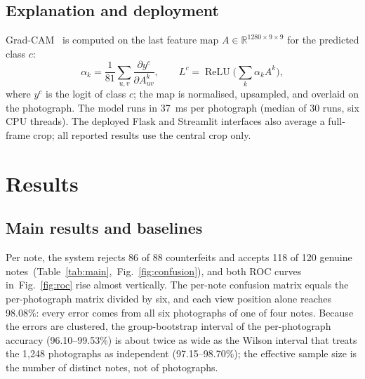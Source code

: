 \documentclass[pdflatex,iicol,sn-mathphys-num]{sn-jnl}
\begin{document}
\subsection{Explanation and deployment}\label{sec:deploy}

Grad-CAM~\cite{selvaraju2017gradcam} is computed on the last feature map
$A\in\mathbb{R}^{1280\times9\times9}$ for the predicted class $c$:
\begin{equation}
\alpha_k = \frac{1}{81}\sum_{u,v}\frac{\partial y^{c}}{\partial A^{k}_{uv}},\qquad
L^{c} = \operatorname{ReLU}\!\Big(\sum_{k}\alpha_k A^{k}\Big),
\label{eq:gradcam}
\end{equation}
where $y^c$ is the logit of class $c$; the map is normalised, upsampled, and overlaid on
the photograph. The model runs in 37~ms per photograph (median of 30 runs, six CPU
threads). The deployed Flask and Streamlit interfaces also average a full-frame crop;
all reported results use the central crop only.

\section{Results}\label{sec:results}

\subsection{Main results and baselines}\label{sec:main}

Per note, the system rejects 86 of 88 counterfeits and accepts 118 of 120 genuine notes~(Table~\ref{tab:main},~Fig.~\ref{fig:confusion}), and both ROC curves in~Fig.~\ref{fig:roc} rise almost vertically. The per-note confusion matrix equals the
per-photograph matrix divided by six, and each view position alone reaches 98.08\%:
every error comes from all six photographs of one of four notes. Because the errors are
clustered, the group-bootstrap interval of the per-photograph accuracy (96.10--99.53\%)
is about twice as wide as the Wilson interval that treats the 1{,}248 photographs as
independent (97.15--98.70\%); the effective sample size is the number of distinct notes,
not of photographs.
\end{document}
